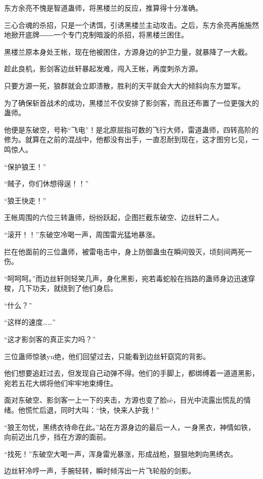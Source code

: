 
\begin{this_body}

东方余亮不愧是智道蛊师，将黑楼兰的反应，推算得十分准确。

三心合魂的杀招，只是一个诱饵，引诱黑楼兰主动攻击。之后，东方余亮再施施然地掀开底牌――一个专门克制暗漩的杀招，将黑楼兰困住。

黑楼兰原本身处王帐，现在他被困住，方源身边的护卫力量，就暴降了一大截。

趁此良机，影剑客边丝轩暴起发难，闯入王帐，再度刺杀方源。

只要方源一死，狼群就会立即溃散，胜利的天平就会大大的倾斜向东方盟军。

为了确保斩首战术的成功，黑楼兰不仅安排了影剑客，而且还布置了一位更强大的蛊师。

他便是东破空，号称“飞电”！是北原屈指可数的飞行大师，雷道蛊师，四转高阶的修为。就算在之前的混战中，他都没有出手，一直忍耐到现在，这才图穷匕见，一鸣惊人。

“保护狼王！”

“贼子，你们休想得逞！！”

“狼王快走！”

王帐周围的六位三转蛊师，纷纷跃起，企图拦截东破空、边丝轩二人。

“滚开！！”东破空冷喝一声，周围雷光猛地暴涨。

拦在他面前的三位蛊师，被雷电击中，身上防御蛊虫在瞬间毁灭，顷刻间两死一伤。

“呵呵呵。”而边丝轩则轻笑几声，身化黑影，宛若毒蛇般在挡路的蛊师身边迅速穿梭，几下功夫，就绕到了他们身后。

“什么？”

“这样的速度……”

“这才影剑客的真正实力吗？”

三位蛊师惊骇yu绝，他们回望过去，只能看到边丝轩窈窕的背影。

他们想要追赶过去，但发现自己动弹不得。他们的手脚上，都绑缚着一道道黑影，宛若五花大绑将他们牢牢地束缚住。

面对东破空、影剑客一上一下的夹击，方源也变了脸sè，目光中流露出慌乱的情绪。他慌忙后退，同时大叫：“快，快来人护我！”

“狼王勿忧，黑绣衣待命在此。”站在方源身边的最后一人，一身黑衣，神情如铁，向前迈出几步，挡在方源的面前。

“找死！”东破空大喝一声，浑身雷光暴涨，形成战枪，狠狠地刺向黑绣衣。

边丝轩冷哼一声，手腕轻转，瞬时倾泻出一片飞轮般的剑影。


\end{this_body}
